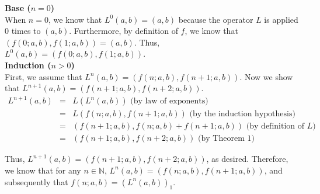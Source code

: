 \documentclass[11pt]{article}
\begin{document}
\begin{prob}{3}
\end{prob}
\begin{sol}

\textbf{Base ($n = 0$)} \\
When $n = 0$, we know that $L^{0}(a,b) = (a,b)$ because the operator $L$ is applied $0$ times to $(a,b)$. Furthermore, by definition of $f$, we know that $(f(0;a,b), f(1;a,b)) = (a,b)$. Thus, $L^{0}(a,b) = (f(0;a,b), f(1;a,b))$. \\

\textbf{Induction ($n > 0$)} \\
First, we assume that $L^{n}(a,b) = (f(n;a,b),f(n + 1;a,b))$. Now we show that $L^{n+1}(a,b) = (f(n + 1;a,b),f(n + 2;a,b))$.
\begin{eqnarray*}
L^{n + 1}(a,b) & = & L(L^{n}(a,b)) \text{ (by law of exponents)}\\
& = & L(f(n;a,b),f(n + 1;a,b)) \text{ (by the induction hypothesis)} \\
& = & (f(n + 1;a,b), f(n;a,b) + f(n + 1;a,b)) \text{ (by definition of $L$)} \\
& = & (f(n + 1;a,b), f(n + 2;a,b)) \text{ (by Theorem 1)}
\end{eqnarray*}

Thus, $L^{n+1}(a,b) = (f(n + 1;a,b),f(n + 2;a,b))$, as desired. Therefore, we know that for any $n \in \mathbb{N}$, $L^{n}(a,b) = (f(n;a,b),f(n + 1;a,b))$, and subsequently that $f(n;a,b) = (L^{n}(a,b))_{1}$.

\end{sol}
\end{document}
